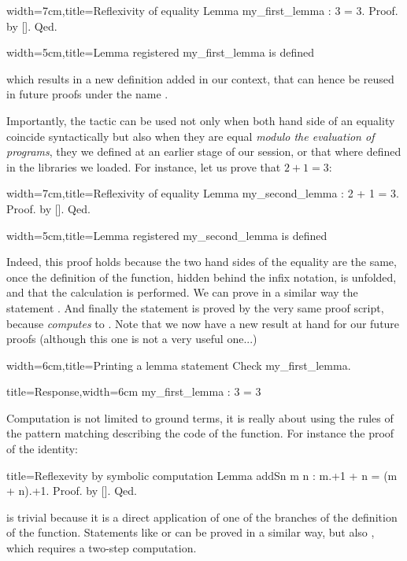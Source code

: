 \begin{coq}{width=7cm,title=Reflexivity of equality}
Lemma my_first_lemma : 3 = 3.
Proof. by []. Qed.
\end{coq}
\begin{coqout}{width=5cm,title=Lemma registered}
my_first_lemma is defined
$~$
\end{coqout}
which results in a new definition added in our context, that can hence
be reused in future proofs under the name .

Importantly, the  tactic can be used not only when both
hand side of an equality coincide syntactically but also when they are
equal \emph{modulo the evaluation of programs}, they we defined at an
earlier stage of our session, or that where defined in the libraries
we loaded. For instance, let us prove that $2 + 1 = 3$:
\begin{coq}{width=7cm,title=Reflexivity of equality}
Lemma my_second_lemma : 2 + 1 = 3.
Proof. by []. Qed.
\end{coq}
\begin{coqout}{width=5cm,title=Lemma registered}
my_second_lemma is defined
$~$
\end{coqout}
Indeed, this proof holds because the two hand sides of the equality
are the same, once the definition of the  function, hidden
behind the infix \C{=} notation, is unfolded, and that the calculation
is performed. We can prove in a similar way the statement . And finally the statement  is proved by the very same
proof script, because  \emph{computes} to
. 
Note that we now have a new result at hand for our future proofs
(although this one is not a very useful one...)

\begin{coq}{width=6cm,title=Printing a lemma statement}
Check my_first_lemma.
\end{coq}
\begin{coqout}{title=Response,width=6cm}
my_first_lemma : 3 = 3
\end{coqout}

Computation is not limited to ground terms, it is really about using
the rules of the pattern matching describing the code of the
function. 
For instance the proof of the  identity:


\begin{coq}{title=Reflexevity by symbolic computation}
Lemma addSn m n : m.+1 + n = (m + n).+1. Proof. by []. Qed.
\end{coq}
is trivial because it is a direct application of one of the branches
of the definition of the  function. Statements like
 or  can be proved in a similar way, but
also , which requires a two-step computation.

